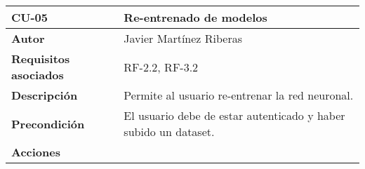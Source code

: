 \begin{longtable}[H]{@{}ll@{}}
\toprule
\begin{minipage}[b]{0.26\columnwidth}\raggedright\strut%
\textbf{CU-05}\strut
\end{minipage} & \begin{minipage}[b]{0.68\columnwidth}\raggedright\strut%
\textbf{Re-entrenado de modelos}\strut
\end{minipage}\tabularnewline
\midrule
\endhead
\begin{minipage}[t]{0.26\columnwidth}\raggedright\strut
\textbf{Autor}\strut
\end{minipage} & \begin{minipage}[t]{0.68\columnwidth}\raggedright\strut
Javier Martínez Riberas\strut
\end{minipage}\tabularnewline
\begin{minipage}[t]{0.26\columnwidth}\raggedright\strut
\textbf{Requisitos asociados}\strut
\end{minipage} & \begin{minipage}[t]{0.68\columnwidth}\raggedright\strut%
RF-2.2, RF-3.2\strut
\end{minipage}\tabularnewline
\begin{minipage}[t]{0.26\columnwidth}\raggedright\strut
\textbf{Descripción}\strut
\end{minipage} & \begin{minipage}[t]{0.68\columnwidth}\raggedright\strut%
Permite al usuario re-entrenar la red neuronal.\strut
\end{minipage}\tabularnewline
\begin{minipage}[t]{0.26\columnwidth}\raggedright\strut
\textbf{Precondición}\strut
\end{minipage} & \begin{minipage}[t]{0.68\columnwidth}\raggedright\strut%
El usuario debe de estar autenticado y haber subido un dataset.\strut
\end{minipage}\tabularnewline
\begin{minipage}[t]{0.26\columnwidth}\raggedright\strut
\textbf{Acciones}\strut
\end{minipage} & \begin{minipage}[t]{0.68\columnwidth}\raggedright\strut%

\end{minipage}
\end{longtable}
